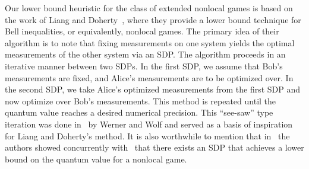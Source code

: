 Our lower bound heuristic for the class of extended nonlocal games is based on the work of Liang and Doherty~\cite{Liang2007}, where they provide a lower bound technique for Bell inequalities, or equivalently, nonlocal games. The primary idea of their algorithm is to note that fixing measurements on one system yields the optimal measurements of the other system via an SDP. The algorithm proceeds in an iterative manner between two SDPs. In the first SDP, we assume that Bob's measurements are fixed, and Alice's measurements are to be optimized over. In the second SDP, we take Alice's optimized measurements from the first SDP and now optimize over Bob's measurements. This method is repeated until the quantum value reaches a desired numerical precision. This ``see-saw'' type iteration was done in~\cite{Werner2001} by Werner and Wolf and served as a basis of inspiration for Liang and Doherty's method. It is also worthwhile to mention that in~\cite{Ito2006} the authors showed concurrently with~\cite{Liang2007} that there exists an SDP that achieves a lower bound on the quantum value for a nonlocal game. 

